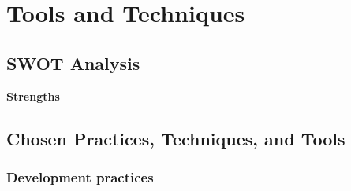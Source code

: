 \section{Tools and Techniques}
\subsection{SWOT Analysis}

\begin{table*}
	\centering
		\begin{tabular}
			\textbf{Strengths}
		\end{tabular}
	\caption{Swot Analaysis}
	\label{tab:SwotAnalaysis}
\end{table*}


\subsection{Chosen Practices, Techniques, and Tools}



\subsubsection{Development practices}


